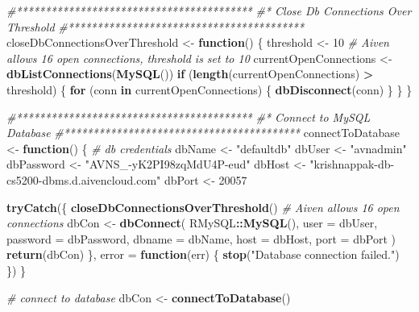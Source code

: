 \documentclass[
]{article}
\newenvironment{Shaded}{\begin{snugshade}}{\end{snugshade}}
\newcommand{\AttributeTok}[1]{\textcolor[rgb]{0.13,0.29,0.53}{#1}}
\newcommand{\CommentTok}[1]{\textcolor[rgb]{0.56,0.35,0.01}{\textit{#1}}}
\newcommand{\ControlFlowTok}[1]{\textcolor[rgb]{0.13,0.29,0.53}{\textbf{#1}}}
\newcommand{\DecValTok}[1]{\textcolor[rgb]{0.00,0.00,0.81}{#1}}
\newcommand{\FunctionTok}[1]{\textcolor[rgb]{0.13,0.29,0.53}{\textbf{#1}}}
\newcommand{\NormalTok}[1]{#1}
\newcommand{\OtherTok}[1]{\textcolor[rgb]{0.56,0.35,0.01}{#1}}
\newcommand{\SpecialCharTok}[1]{\textcolor[rgb]{0.81,0.36,0.00}{\textbf{#1}}}
\newcommand{\StringTok}[1]{\textcolor[rgb]{0.31,0.60,0.02}{#1}}
\begin{document}
\begin{Shaded}
\begin{Highlighting}[]
\CommentTok{\#*****************************************}
\CommentTok{\#* Close Db Connections Over Threshold}
\CommentTok{\#*****************************************}
\NormalTok{closeDbConnectionsOverThreshold }\OtherTok{\textless{}{-}} \ControlFlowTok{function}\NormalTok{() \{}
\NormalTok{  threshold }\OtherTok{\textless{}{-}} \DecValTok{10} \CommentTok{\# Aiven allows 16 open connections, threshold is set to 10}
\NormalTok{  currentOpenConnections }\OtherTok{\textless{}{-}} \FunctionTok{dbListConnections}\NormalTok{(}\FunctionTok{MySQL}\NormalTok{())}
  \ControlFlowTok{if}\NormalTok{ (}\FunctionTok{length}\NormalTok{(currentOpenConnections) }\SpecialCharTok{\textgreater{}}\NormalTok{ threshold) \{}
    \ControlFlowTok{for}\NormalTok{ (conn }\ControlFlowTok{in}\NormalTok{ currentOpenConnections) \{}
      \FunctionTok{dbDisconnect}\NormalTok{(conn)}
\NormalTok{    \}}
\NormalTok{  \}}
\NormalTok{\}}

\CommentTok{\#*****************************************}
\CommentTok{\#* Connect to MySQL Database}
\CommentTok{\#*****************************************}
\NormalTok{connectToDatabase }\OtherTok{\textless{}{-}} \ControlFlowTok{function}\NormalTok{() \{}
  \CommentTok{\# db credentials}
\NormalTok{  dbName }\OtherTok{\textless{}{-}} \StringTok{"defaultdb"}
\NormalTok{  dbUser }\OtherTok{\textless{}{-}} \StringTok{"avnadmin"}
\NormalTok{  dbPassword }\OtherTok{\textless{}{-}} \StringTok{"AVNS\_{-}yK2PI98zqMdU4P{-}eud"}
\NormalTok{  dbHost }\OtherTok{\textless{}{-}} \StringTok{"krishnappak{-}db{-}cs5200{-}dbms.d.aivencloud.com"}
\NormalTok{  dbPort }\OtherTok{\textless{}{-}} \DecValTok{20057}
  
  \FunctionTok{tryCatch}\NormalTok{(\{}
    \FunctionTok{closeDbConnectionsOverThreshold}\NormalTok{() }\CommentTok{\# Aiven allows 16 open connections}
\NormalTok{    dbCon }\OtherTok{\textless{}{-}} \FunctionTok{dbConnect}\NormalTok{(}
\NormalTok{      RMySQL}\SpecialCharTok{::}\FunctionTok{MySQL}\NormalTok{(),}
      \AttributeTok{user =}\NormalTok{ dbUser,}
      \AttributeTok{password =}\NormalTok{ dbPassword,}
      \AttributeTok{dbname =}\NormalTok{ dbName,}
      \AttributeTok{host =}\NormalTok{ dbHost,}
      \AttributeTok{port =}\NormalTok{ dbPort}
\NormalTok{    )}
    \FunctionTok{return}\NormalTok{(dbCon)}
\NormalTok{  \}, }\AttributeTok{error =} \ControlFlowTok{function}\NormalTok{(err) \{}
    \FunctionTok{stop}\NormalTok{(}\StringTok{"Database connection failed."}\NormalTok{)}
\NormalTok{  \})}
\NormalTok{\}}

\CommentTok{\# connect to database}
\NormalTok{dbCon }\OtherTok{\textless{}{-}} \FunctionTok{connectToDatabase}\NormalTok{()}
\end{Highlighting}
\end{Shaded}
\end{document}
